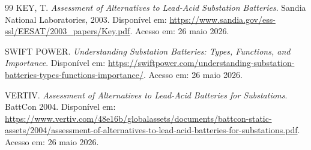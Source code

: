 \documentclass[12pt]{article}
\begin{document}
\begin{thebibliography}{99}
KEY, T. \textit{Assessment of Alternatives to Lead-Acid Substation Batteries}. Sandia
National Laboratories, 2003. Disponível em:
\url{https://www.sandia.gov/ess-ssl/EESAT/2003_papers/Key.pdf}. Acesso em: 26 maio 2026.

SWIFT POWER. \textit{Understanding Substation Batteries: Types, Functions, and
Importance}. Disponível em:
\url{https://swiftpower.com/understanding-substation-batteries-types-functions-importance/}.
Acesso em: 26 maio 2026.

VERTIV. \textit{Assessment of Alternatives to Lead-Acid Batteries for Substations}.
BattCon 2004. Disponível em:
\url{https://www.vertiv.com/48e16b/globalassets/documents/battcon-static-assets/2004/assessment-of-alternatives-to-lead-acid-batteries-for-substations.pdf}.
Acesso em: 26 maio 2026.

\end{thebibliography}
\end{document}
